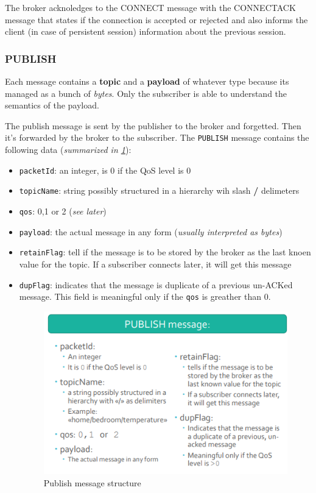 \documentclass[10pt,a4paper]{report}
\theoremstyle{definition}
\begin{document}
The broker acknoledges to the CONNECT message with the CONNECTACK message that states if the connection is accepted or rejected and also informs the client (in case of persistent session) information about the previous session.
\subsubsection{PUBLISH}\label{sec:publish}
Each message contains a \textbf{topic} and a \textbf{payload} of whatever type because its managed as a bunch of \textit{bytes}. Only the subscriber is able to understand the semantics of the payload.

The publish message is sent by the publisher to the broker and forgetted. Then it's forwarded by the broker to the subscriber.
The \texttt{PUBLISH} message contains the following data (\textit{summarized in \ref{mqtt-publish}}):
\begin{itemize}
	\item 
	\texttt{packetId}: an integer, is 0 if the QoS level is 0
	\item 
	\texttt{topicName}: string possibly structured in a hierarchy wih slash \textbf{/} delimeters
	\item 
	\texttt{qos}: 0,1 or 2 (\textit{see later})
	\item 
	\texttt{payload}: the actual message in any form (\textit{usually interpreted as bytes})
	\item 
	\texttt{retainFlag}: tell if the message is to be stored by the broker as the last knoen value for the topic. If a subscriber connects later, it will get this message
	\item 
	\texttt{dupFlag}: indicates that the message is duplicate of a previous un-ACKed message. This field is meaningful only if the \texttt{qos} is greather than 0.
	\begin{figure}[h]
		\centering\includegraphics[scale=0.50]{images/Pasted image 20230303165056.png}
		\caption{Publish message structure}\label{mqtt-publish}\end{figure}
	

\end{itemize}
\end{document}
